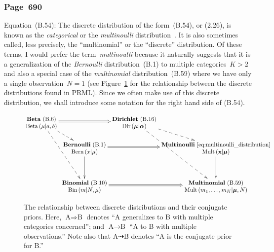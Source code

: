 \documentclass[12pt,a4paper]{article}
\newcommand{\erratum}[1]{%
\subsubsection*{#1}
\addcontentsline{toc}{subsection}{#1}}
\begin{document}
\erratum{Page~690}
Equation~(B.54):
The discrete distribution of the form~(B.54), or (2.26), is known as
the \emph{categorical} or the \emph{multinoulli} distribution~\citep{Murphy:MachineLearning}.
It is also sometimes called, less precisely, the ``multinomial'' or the ``discrete'' distribution.
Of these terms, I would prefer the term~\emph{multinoulli}
because it naturally suggests that it is
a generalization of the \emph{Bernoulli} distribution~(B.1) to multiple categories~$K > 2$ and
also a special case of the \emph{multinomial} distribution~(B.59)
where we have only a single observation~$N = 1$
(see Figure~\ref{fig:relationship_between_discrete_distributions}
for the relationship between the discrete distributions found in PRML).
Since we often make use of this discrete distribution,
we shall introduce some notation for the right hand side of (B.54).

\begin{figure}
\centering
{\fontfamily{\sfdefault}\selectfont
\begin{equation*}
\xymatrix@R-2ex@C-5ex{
\txt{\textbf{Beta}~(B.6) \\
$\operatorname{Beta}\left(\mu\middle|a, b\right)$}
\ar@2[rr]
\ar@{-->}[dr]
\ar@{-->}[dddr]
&
&
\txt{\textbf{Dirichlet}~(B.16) \\
$\operatorname{Dir}\left(\bm{\mu}\middle|\bm{\alpha}\right)$}
\ar@{-->}[dr]
\ar@{-->}[dddr]
\\
&
\txt{\textbf{Bernoulli}~(B.1) \\
$\operatorname{Bern}\left(x\middle|\mu\right)$}
\ar[dd]
\ar@2[rr]
&
&
\txt{\textbf{Multinoulli}~\eqref{eq:multinoulli_distribution} \\
$\operatorname{Mult}\left(\mathbf{x}\middle|\bm{\mu}\right)$}
\ar[dd]
\\
\\
&
\txt{\textbf{Binomial}~(B.10) \\
$\operatorname{Bin}\left(m\middle|N, \mu\right)$}
\ar@2[rr]
&
&
\txt{\textbf{Multinomial}~(B.59) \\
$\operatorname{Mult}\left(m_1, \dots, m_K\middle|\bm{\mu}, N\right)$}
}
\end{equation*}}
\caption{The relationship between discrete distributions and their conjugate priors.
Here, $\text{A} \Rightarrow \text{B}$ denotes
``A generalizes to B with multiple categories concerned''; and
$\text{A} \rightarrow \text{B}$ ``A to B with multiple observations.''
Note also that $\text{A} \dashrightarrow \text{B}$ denotes ``A is the conjugate prior for B.''}
\label{fig:relationship_between_discrete_distributions}
\end{figure}
\end{document}
